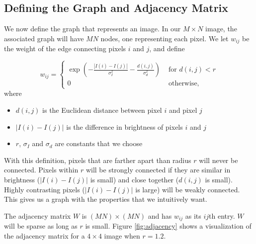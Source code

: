 \subsection*{Defining the Graph and Adjacency Matrix}

We now define the graph that represents an image. In our $M \times N$ image, the associated graph will have $MN$ nodes, one representing each pixel. We let $w_{ij}$ be the weight of the edge connecting pixels $i$ and $j$, and define

 \begin{equation}
 \label{eq:adjacency}
w_{ij} = \begin{cases} \exp(-\frac{|I(i) - I(j)|}{\sigma_I^2}-\frac{d(i,j)}{\sigma_d^2}) & \mbox{ for $d(i,j) < r$} \\ 0 & \mbox{ otherwise,} \end{cases}
\end{equation}
where
\begin{itemize}
	\item$d(i,j)$ is the Euclidean distance between pixel $i$ and pixel $j$
	\item $|I(i) - I(j)|$ is the difference in brightness of pixels $i$ and $j$
	\item $r$, $\sigma_I$ and $\sigma_d$ are constants that we choose
\end{itemize}

With this definition, pixels that are farther apart than radius $r$ will never be connected.
Pixels within $r$ will be strongly connected if they are similar in brightness ($|I(i) - I(j)|$ is small) and close together ($d(i,j)$ is small).
Highly contrasting pixels ($|I(i) - I(j)|$ is large) will be weakly connected.
This gives us a graph with the properties that we intuitively want.

The adjacency matrix $W$ is $(MN) \times (MN)$ and has $w_{ij}$ as its $ij$th entry.
$W$ will be sparse as long as $r$ is small.
Figure \ref{fig:adjacency} shows a visualization of the adjacency matrix for a $4 \times 4$ image when $r=1.2$.

